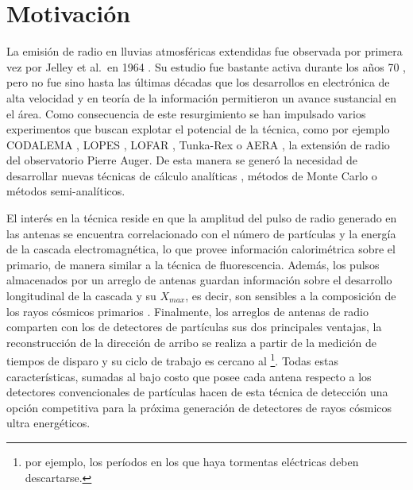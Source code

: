 \chapter*{Motivaci\'on}
\label{ch:motRadio}


La emisi\'on de radio en lluvias atmosf\'ericas extendidas fue observada por primera vez por Jelley et al.\ en 1964 \cite{jelley1966radio}. Su estudio fue bastante activa durante los a\~nos 70 \cite{allan1971}, pero no fue sino hasta las \'ultimas d\'ecadas que los desarrollos en electr\'onica de alta velocidad y en teor\'ia de la informaci\'on permitieron un avance sustancial en el \'area.
Como consecuencia de este resurgimiento se han impulsado varios experimentos que buscan explotar el potencial de la t\'ecnica, como por ejemplo CODALEMA \cite{ardouin2009radio}, LOPES \cite{huege2012lopes}, LOFAR \cite{horandel2009lofar}, Tunka-Rex \cite{schroder2013tunka} o AERA \cite{kelley2011aera}, la extensi\'on de radio del observatorio Pierre Auger.
De esta manera se gener\'o la necesidad de desarrollar nuevas t\'ecnicas de c\'alculo anal\'iticas \cite{huege2003radio,scholten2008macroscopic}, m\'etodos de Monte Carlo \cite{huege2007monte,ludwig2011reas3} o m\'etodos semi-anal\'iticos\cite{scholten2009macroscopic}.

El interés en la técnica reside en que la amplitud del pulso de radio generado en las antenas se encuentra correlacionado con el número de partículas y la energía de la cascada electromagnética, lo que provee información calorimétrica sobre el primario, de manera similar a la técnica de fluorescencia.
Adem\'as, los pulsos almacenados por un arreglo de antenas guardan información sobre el desarrollo longitudinal de la cascada y su $X_{max}$, es decir, son sensibles a la composici\'on de los rayos c\'osmicos primarios \cite{cite:hauge_rec,cite:lofar_rec}.
Finalmente, los arreglos de antenas de radio comparten con los de detectores de partículas sus dos principales ventajas, la reconstrucción de la dirección de arribo se realiza a partir de la medición de tiempos de disparo y su ciclo de trabajo es cercano al \footnote{por ejemplo, los períodos en los que haya tormentas eléctricas deben descartarse.}.
Todas estas características, sumadas al bajo costo que posee cada antena respecto a los detectores convencionales de partículas hacen de esta técnica de detección una opción competitiva para la próxima generación de detectores de rayos c\'osmicos ultra energ\'eticos.

